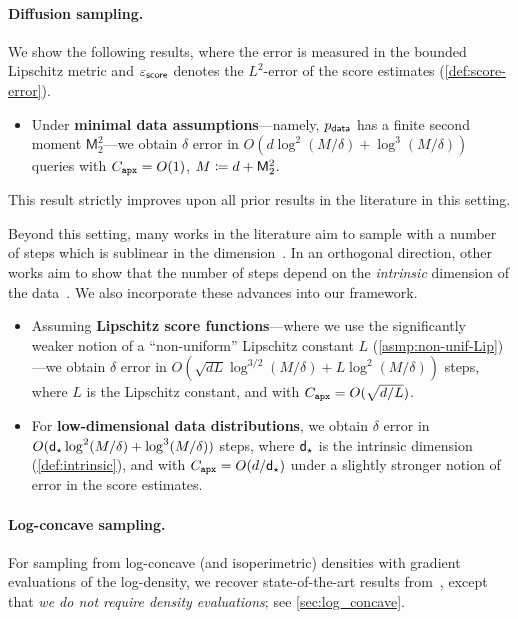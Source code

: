 \documentclass{article} %
\let\oldparagraph\paragraph
\renewcommand{\paragraph}[1]{\oldparagraph{#1.}}
\begin{document}
\paragraph{Diffusion sampling}
We show the following results, where the error is measured in the bounded Lipschitz metric and $\varepsilon_{\mathsf{score}}$ denotes the $L^2$-error of the score estimates (\cref{def:score-error}).
\begin{itemize}
    \item Under \textbf{minimal data assumptions}---namely, $p_{\mathsf{data}}$ has a finite second moment $\mathsf M_2^2$---we obtain $\delta$ error in $O(d\log^2(M/\delta) + \log^3(M/\delta))$ queries with $C_{\texttt{apx}}=O(1)$, $M \coloneqq d + \mathsf M_2^2$.
\end{itemize}
This result strictly improves upon all prior results in the literature in this setting.

Beyond this setting, many works in the literature aim to sample with a number of steps which is sublinear in the dimension~\citep{Chen+23FlowODE, jiao2024instance,jiao2025optimal, zhang2025sublinear}.
In an orthogonal direction, other works aim to show that the number of steps depend on the \emph{intrinsic} dimension of the data~\citep{azangulov2024convergence, huang2024denoising, li2024adapting,potaptchik2024linear,li2025dimension, liang2025low,tang2025adaptivity}.
We also incorporate these advances into our framework.
\begin{itemize}
    \item Assuming \textbf{Lipschitz score functions}---where we use the significantly weaker notion of a ``non-uniform'' Lipschitz constant $L$ (\cref{asmp:non-unif-Lip})---we obtain $\delta$ error in $O(\sqrt{dL} \log^{3/2}(M/\delta) + L\log^2(M/\delta))$ steps, where $L$ is the Lipschitz constant, and with $C_{\texttt{apx}} = O(\sqrt{d/L})$.
    \item For \textbf{low-dimensional data distributions}, we obtain $\delta$ error in $O(\mathsf{d}_\star \log^2(M/\delta) + \log^3(M/\delta))$ steps, where $\mathsf{d}_\star$ is the intrinsic dimension (\cref{def:intrinsic}), and with $C_{\texttt{apx}} = O(d/\mathsf{d}_\star)$ under a slightly stronger notion of error in the score estimates.
\end{itemize}

\paragraph{Log-concave sampling}
For sampling from log-concave (and isoperimetric) densities with gradient evaluations of the log-density, we recover state-of-the-art results from~\citet{FanYuaChe23ImprovedProx}, except that \emph{we do not require density evaluations}; see \cref{sec:log_concave}.
\end{document}

